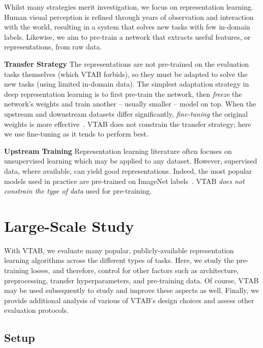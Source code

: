 \documentclass{article}
\newcommand{\myparagraph}[1]{\noindent\textbf{#1}\quad}
\newcommand{\imagenet}{ImageNet}
\begin{document}
Whilst many strategies merit investigation, we focus on representation learning.
Human visual perception is refined through years of observation and interaction with the world, resulting in a system that solves new tasks with few in-domain labels.
Likewise, we aim to pre-train a network that extracts useful features, or representations, from raw data.

\myparagraph{Transfer Strategy}
The representations are not pre-trained on the evaluation tasks themselves (which VTAB forbids), so they must be adapted to solve the new tasks (using limited in-domain data).
The simplest adaptation strategy in deep representation learning is to first pre-train the network, then \emph{freeze} the network's weights and train another -- usually smaller -- model on top.
When the upstream and downstream datasets differ significantly,
\emph{fine-tuning} the original weights is more effective~\citep{yosinski2014,kornblith2018better}.
VTAB does not constrain the transfer strategy; here we use fine-tuning as it tends to perform best.

\myparagraph{Upstream Training}
Representation learning literature often focuses on unsupervised learning which may be applied to any dataset. However, supervised data, where available, can yield good representations. Indeed, the most popular models used in practice are pre-trained on \imagenet{} labels~\citep[and refs therein]{huh2016makes}.
VTAB \emph{does not constrain the type of data} used for pre-training.



\section{Large-Scale Study\label{sec:experiments}}

With VTAB, we evaluate many popular, publicly-available representation learning algorithms across the different types of tasks.
Here, we study the pre-training losses, and therefore, control for other factors such as architecture, preprocessing, transfer hyperparameters, and pre-training data.
Of course, VTAB may be used subsequently to study and improve these aspects as well.
Finally, we provide additional analysis of various of VTAB's design choices and assess other evaluation protocols.


\subsection{Setup\label{sec:setup}}
\end{document}
